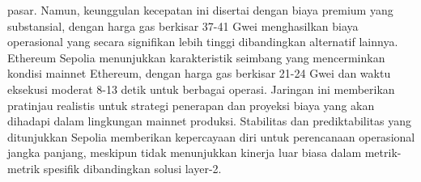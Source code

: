 pasar. Namun, keunggulan kecepatan ini disertai dengan biaya premium yang
substansial, dengan harga gas berkisar 37-41 Gwei menghasilkan biaya
operasional yang secara signifikan lebih tinggi dibandingkan alternatif
lainnya. Ethereum Sepolia menunjukkan karakteristik seimbang yang mencerminkan
kondisi mainnet Ethereum, dengan harga gas berkisar 21-24 Gwei dan waktu
eksekusi moderat 8-13 detik untuk berbagai operasi. Jaringan ini memberikan
pratinjau realistis untuk strategi penerapan dan proyeksi biaya yang akan
dihadapi dalam lingkungan mainnet produksi. Stabilitas dan prediktabilitas yang
ditunjukkan Sepolia memberikan kepercayaan diri untuk perencanaan operasional
jangka panjang, meskipun tidak menunjukkan kinerja luar biasa dalam
metrik-metrik spesifik dibandingkan solusi layer-2.